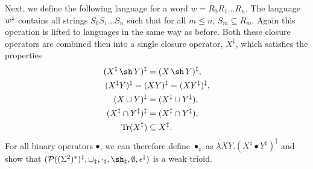 \documentclass{llncs}
\DeclareMathOperator{\sha}{\sh}
\DeclareMathOperator{\tr}{Tr}
\newcommand{\udagger}{\text{$\rotatebox[origin=c]{180}{$\dagger$}$}}
\begin{document}
Next, we define the following language for a word $w = R_0R_1\dots
R_n$. The language $w^\udagger$ contains all strings $S_0S_1\dots S_n$
such that for all $m \le n$, $S_m \subseteq R_m$. Again this operation
is lifted to languages in the same way as before. Both these closure
operators are combined then into a single closure operator,
$X^\ddagger$, which satisfies the properties
\begin{align*}
(X^\ddagger \sha Y)^\ddagger &= (X \sha Y)^\ddagger,\\
(X^\ddagger Y)^\ddagger = (&XY)^\ddagger = (XY^\ddagger)^\ddagger,\\
(X \cup Y)^\ddagger &= (X^\ddagger \cup Y^\ddagger),\\
(X^\ddagger \cap Y^\ddagger)^\ddagger &= (X^\ddagger \cap Y^\ddagger),\\
\tr(X^\ddagger) &\subseteq X^\ddagger.
\end{align*}
For all binary operators $\bullet$, we can therefore define
$\bullet_\ddagger$ as $\lambda X Y. (X^\ddagger\bullet
Y^\ddagger)^\ddagger$ and show that
$(\mathcal{P}((\Sigma^2)^*)^\ddagger,\cup_\ddagger,\cdot_\ddagger,\sha_\ddagger,\emptyset,{\epsilon}^\ddagger)$
is a weak trioid.
\end{document}
